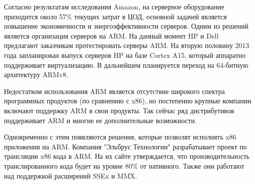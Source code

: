 Согласно результатам исследования Amazon, на серверное оборудование приходится около 57\% текущих затрат в ЦОД, основной задачей является повышение экономичности и энергоэффективности серверов\cite{bib:lan_magazine}. Одним из решений является организация серверов на ARM. На данный момент HP и Dell предлагают заказчикам протестировать серверы ARM. На вторую половину 2013 года запланирован выпуск серверов HP на базе Cortex A15, который аппаратно поддерживает виртуализацию. В дальнейшем планируется переход на 64-битную архитектуру ARMv8.

Недостатком использования ARM является отсутствие широкого спектра программных продуктов (по сравнению с x86), но постепенно крупные компании включают поддержку ARM в свои продукты. Так сейчас ряд дистрибутивов поддерживает ARM и многие ее дополнительные возможности.

Одновременно с этим появляются решения, которые позволят исполнять x86 приложения на ARM. Компания "Эльбрус Технологии" разрабатывает проект по трансляции x86 кода в ARM. На их сайте утверждается, что производительность транслированного кода будет на уровне 80\% от нативного\cite{bib:site_elbrus}. Также они работают над поддержкой расширений SSEx и MMX. 